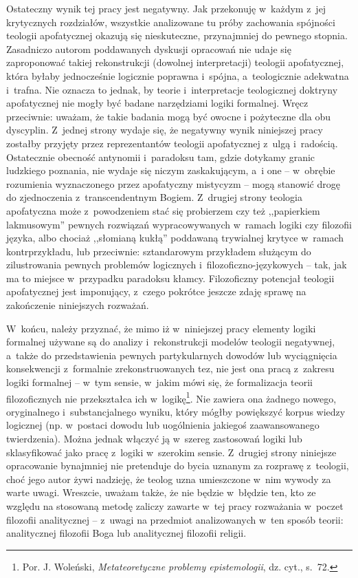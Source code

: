 Ostateczny wynik tej pracy jest negatywny. Jak przekonuję w~każdym z~jej krytycznych rozdziałów, wszystkie analizowane tu próby zachowania spójności teologii apofatycznej okazują się nieskuteczne, przynajmniej do pewnego stopnia. Zasadniczo autorom poddawanych dyskusji opracowań nie udaje się zaproponować takiej rekonstrukcji (dowolnej interpretacji) teologii apofatycznej, która byłaby jednocześnie logicznie poprawna i~spójna, a~teologicznie adekwatna i~trafna. Nie oznacza to jednak, by teorie i~interpretacje teologicznej doktryny apofatycznej nie mogły być badane narzędziami logiki formalnej. Wręcz przeciwnie: uważam, że takie badania mogą być owocne i pożyteczne dla obu dyscyplin. Z~jednej strony wydaje się, że negatywny wynik niniejszej pracy zostałby przyjęty przez reprezentantów teologii apofatycznej z~ulgą i~radością. Ostatecznie obecność antynomii i~paradoksu tam, gdzie dotykamy granic ludzkiego poznania, nie wydaje się niczym zaskakującym, a~i one -- w~obrębie rozumienia wyznaczonego przez apofatyczny mistycyzm -- mogą stanowić drogę do zjednoczenia z~transcendentnym Bogiem. Z~drugiej strony teologia apofatyczna może z~powodzeniem stać się probierzem czy też ,,papierkiem lakmusowym'' pewnych rozwiązań wypracowywanych w~ramach logiki czy filozofii języka, albo chociaż ,,słomianą kukłą'' poddawaną trywialnej krytyce w~ramach kontrprzykładu, lub przeciwnie: sztandarowym przykładem służącym do zilustrowania pewnych problemów logicznych i~filozoficzno-językowych -- tak, jak ma to miejsce w~przypadku paradoksu kłamcy. Filozoficzny potencjał teologii apofatycznej jest imponujący, z~czego pokrótce jeszcze zdaję sprawę na zakończenie niniejszych rozważań.

W~końcu, należy przyznać, że mimo iż w~niniejszej pracy elementy logiki formalnej używane są do analizy i~rekonstrukcji modelów teologii negatywnej, a~także do przedstawienia pewnych partykularnych dowodów lub wyciągnięcia konsekwencji z~formalnie zrekonstruowanych tez, nie jest ona pracą z~zakresu logiki formalnej -- w~tym sensie, w~jakim mówi się, że formalizacja teorii filozoficznych nie przekształca ich w~logikę\footnote{Por. J. Woleński, \textit{Metateoretyczne problemy epistemologii}, dz. cyt., s.~72.}. Nie zawiera ona żadnego nowego, oryginalnego i~substancjalnego wyniku, który mógłby powiększyć korpus wiedzy logicznej (np. w~postaci dowodu lub uogólnienia jakiegoś zaawansowanego twierdzenia). Można jednak włączyć ją w~szereg zastosowań logiki lub sklasyfikować jako pracę z~logiki w~szerokim sensie. Z~drugiej strony niniejsze opracowanie bynajmniej nie pretenduje  do bycia uznanym za rozprawę z~teologii, choć jego autor żywi nadzieję, że teolog uzna umieszczone w~nim wywody za warte uwagi. Wreszcie, uważam także, że nie będzie w~błędzie ten, kto ze względu na stosowaną metodę zaliczy zawarte w~tej pracy rozważania w~poczet filozofii analitycznej -- z~uwagi na przedmiot analizowanych w~ten sposób teorii: analitycznej filozofii Boga lub analitycznej filozofii religii.


